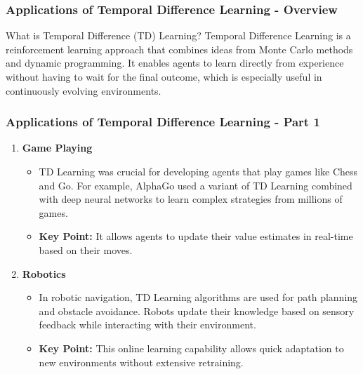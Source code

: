 \documentclass[aspectratio=169]{beamer}
\begin{document}
\begin{frame}[fragile]
  \frametitle{Applications of Temporal Difference Learning - Overview}
  \begin{block}{What is Temporal Difference (TD) Learning?}
    Temporal Difference Learning is a reinforcement learning approach that combines ideas from Monte Carlo methods and dynamic programming. It enables agents to learn directly from experience without having to wait for the final outcome, which is especially useful in continuously evolving environments.
  \end{block}
\end{frame}

\begin{frame}[fragile]
  \frametitle{Applications of Temporal Difference Learning - Part 1}
  \begin{enumerate}
    \item \textbf{Game Playing}
      \begin{itemize}
        \item TD Learning was crucial for developing agents that play games like Chess and Go. For example, AlphaGo used a variant of TD Learning combined with deep neural networks to learn complex strategies from millions of games.
        \item \textbf{Key Point:} It allows agents to update their value estimates in real-time based on their moves.
      \end{itemize}

    \item \textbf{Robotics}
      \begin{itemize}
        \item In robotic navigation, TD Learning algorithms are used for path planning and obstacle avoidance. Robots update their knowledge based on sensory feedback while interacting with their environment.
        \item \textbf{Key Point:} This online learning capability allows quick adaptation to new environments without extensive retraining.
      \end{itemize}
  \end{enumerate}
\end{frame}
\end{document}
